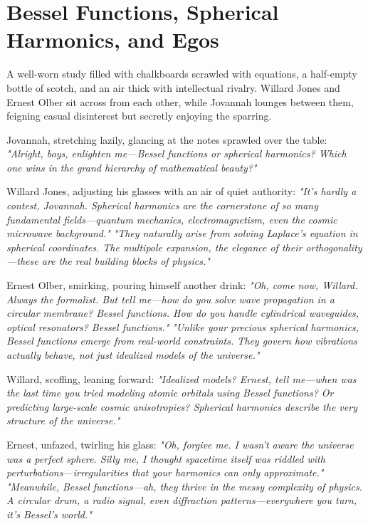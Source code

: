 \section*{Bessel Functions, Spherical Harmonics, and Egos}
A well-worn study filled with chalkboards scrawled with equations, a half-empty bottle of scotch, and an air thick with intellectual rivalry. Willard Jones and Ernest Olber sit across from each other, while Jovannah lounges between them, feigning casual disinterest but secretly enjoying the sparring.

Jovannah, stretching lazily, glancing at the notes sprawled over the table: \textit{"Alright, boys, enlighten me—Bessel functions or spherical harmonics? Which one wins in the grand hierarchy of mathematical beauty?"}

\bigskip

Willard Jones, adjusting his glasses with an air of quiet authority: \textit{"It’s hardly a contest, Jovannah. Spherical harmonics are the cornerstone of so many fundamental fields—quantum mechanics, electromagnetism, even the cosmic microwave background."} \newline
\textit{"They naturally arise from solving Laplace’s equation in spherical coordinates. The multipole expansion, the elegance of their orthogonality—these are the real building blocks of physics."}

\bigskip

Ernest Olber, smirking, pouring himself another drink: \textit{"Oh, come now, Willard. Always the formalist. But tell me—how do you solve wave propagation in a circular membrane? Bessel functions. How do you handle cylindrical waveguides, optical resonators? Bessel functions."} \newline
\textit{"Unlike your precious spherical harmonics, Bessel functions emerge from real-world constraints. They govern how vibrations actually behave, not just idealized models of the universe."}

\bigskip

Willard, scoffing, leaning forward: \textit{"Idealized models? Ernest, tell me—when was the last time you tried modeling atomic orbitals using Bessel functions? Or predicting large-scale cosmic anisotropies? Spherical harmonics describe the very structure of the universe."}

\bigskip

Ernest, unfazed, twirling his glass: \textit{"Oh, forgive me. I wasn’t aware the universe was a perfect sphere. Silly me, I thought spacetime itself was riddled with perturbations—irregularities that your harmonics can only approximate."} \newline
\textit{"Meanwhile, Bessel functions—ah, they thrive in the messy complexity of physics. A circular drum, a radio signal, even diffraction patterns—everywhere you turn, it’s Bessel’s world."}

